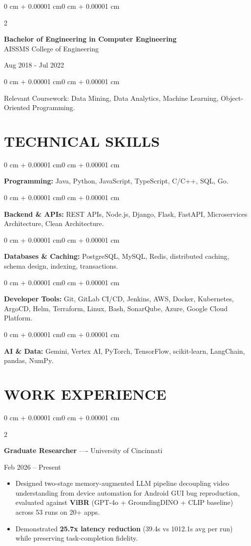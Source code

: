 \documentclass[10pt, letterpaper]{article}
\newenvironment{highlights}{
    \begin{itemize}[
        topsep=0.10 cm,
        parsep=0.06 cm,
        partopsep=0pt,
        itemsep=0.06 cm,
        leftmargin=12pt
    ]
}{
    \end{itemize}
}
\newenvironment{onecolentry}{
    \begin{adjustwidth}{0 cm + 0.00001 cm}{0 cm + 0.00001 cm}
}{
    \end{adjustwidth}
}
\newenvironment{twocolentry}[2][]{
    \onecolentry
    \def\secondColumn{#2}
    \setcolumnwidth{\fill, 4.5 cm}
    \begin{paracol}{2}
}{
    \switchcolumn \raggedleft \secondColumn
    \end{paracol}
    \endonecolentry
}
\begin{document}
\begin{twocolentry}{
    Aug 2018 - Jul 2022
}
    \textbf{Bachelor of Engineering in Computer Engineering} \\
    AISSMS College of Engineering
\end{twocolentry}
\begin{onecolentry}
Relevant Coursework: Data Mining, Data Analytics, Machine Learning, Object-Oriented Programming.
\end{onecolentry}
\section{TECHNICAL SKILLS}
\begin{onecolentry}
\textbf{Programming:} Java, Python, JavaScript, TypeScript, C/C++, SQL, Go.
\end{onecolentry}
\vspace{0.06 cm}
\begin{onecolentry}
\textbf{Backend \& APIs:} REST APIs, Node.js, Django, Flask, FastAPI, Microservices Architecture, Clean Architecture.
\end{onecolentry}
\vspace{0.06 cm}
\begin{onecolentry}
\textbf{Databases \& Caching:} PostgreSQL, MySQL, Redis, distributed caching, schema design, indexing, transactions.
\end{onecolentry}
\vspace{0.06 cm}
\begin{onecolentry}
\textbf{Developer Tools:} Git, GitLab CI/CD, Jenkins, AWS, Docker, Kubernetes, ArgoCD, Helm, Terraform, Linux, Bash, SonarQube, Azure, Google Cloud Platform.
\end{onecolentry}
\vspace{0.06 cm}
\begin{onecolentry}
\textbf{AI \& Data:} Gemini, Vertex AI, PyTorch, TensorFlow, scikit-learn, LangChain, pandas, NumPy.
\end{onecolentry}

\section{WORK EXPERIENCE}
\begin{twocolentry}{Feb 2026 -- Present}
\textbf{Graduate Researcher} ---- University of Cincinnati
\end{twocolentry}
\begin{highlights}
  \item Designed two-stage memory-augmented LLM pipeline decoupling video understanding from device automation for Android GUI bug reproduction, evaluated against \textbf{ViBR} (GPT-4o + GroundingDINO + CLIP baseline) across 53 runs on 20+ apps.
  \item Demonstrated \textbf{25.7x latency reduction} (39.4s vs 1012.1s avg per run) while preserving task-completion fidelity.
\end{highlights}
\end{document}
